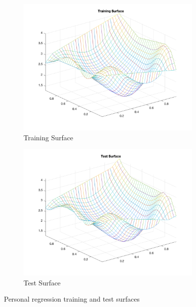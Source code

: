 \documentclass[11pt,conference,compsoc]{IEEEtran}
\begin{document}
\begin{figure}[]
        \centering
        \begin{subfigure}{0.33\linewidth}
            \includegraphics[width=\linewidth]{images/training.png}
            \caption{Training Surface}
        \end{subfigure}
        \begin{subfigure}{0.33\linewidth}
            \includegraphics[width=\linewidth]{images/test.png}
            \caption{Test Surface}
        \end{subfigure}
        \caption{Personal regression training and test surfaces}
        \label{fig:3}
\end{figure}
\end{document}
